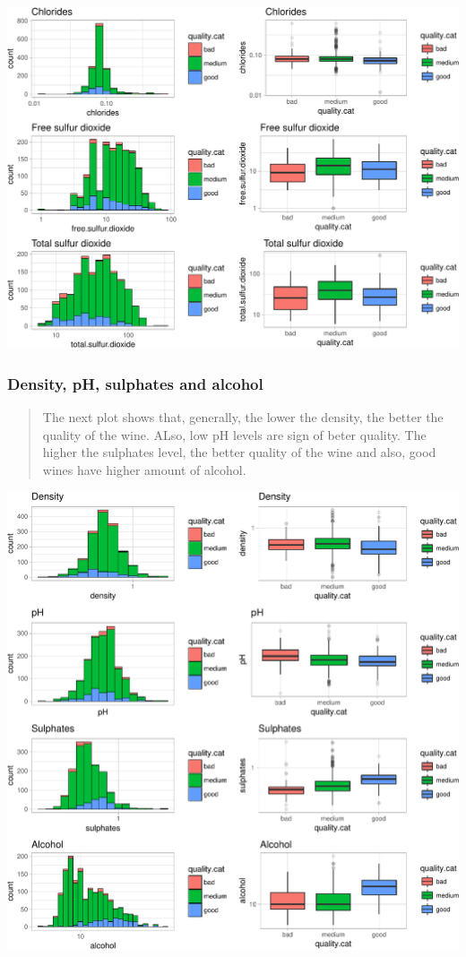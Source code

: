 \documentclass[]{article}
\begin{document}
\includegraphics{Figs/Bivariate_Plots_chlorides-1.pdf}

\subsubsection{Density, pH, sulphates and
alcohol}\label{density-ph-sulphates-and-alcohol-1}

\begin{quote}
The next plot shows that, generally, the lower the density, the better
the quality of the wine. ALso, low pH levels are sign of beter quality.
The higher the sulphates level, the better quality of the wine and also,
good wines have higher amount of alcohol.
\end{quote}

\includegraphics{Figs/Bivariate_Plots_density-1.pdf}
\end{document}
